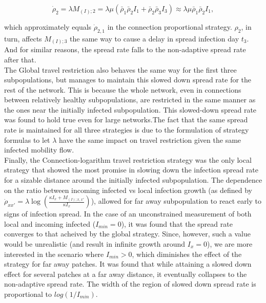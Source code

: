 \begin{equation}
	\dot{\rho}_2=\lambda M_{(I);2}= \lambda \mu (\bar{\rho}_{1} \bar{\rho}_{2} I_1 + \bar{\rho}_{2} \bar{\rho}_{3} I_3) \approx \lambda \mu \bar{\rho}_{1} \bar{\rho}_{2} I_1,
\end{equation}

which approximately equals $\dot{\rho}_{2,1}$ in the connection proportional strategy. $\rho_2$, in turn, affects $M_{(I);3}$ the same way to cause a delay in spread infection day $t_3$. And for similar reasons, the spread rate falls to the non-adaptive spread rate after that.\\

The Global travel restriction also behaves the same way for the first three subpopulations, but manages to maintain this slowed down spread rate for the rest of the network. This is because the whole network, even in connections between relatively healthy subpopulations, are restricted in the same manner as the ones near the initially infected subpopulation. This slowed-down spread rate was found to hold true even for large networks.The fact that the same spread rate is maintained for all three strategies is due to the formulation of strategy formulas to let $\lambda$ have the same impact on travel restriction given the same infected mobility flow.\\

Finally, the Connection-logarithm travel restriction strategy was the only local strategy that showed the most promise in slowing down the infection spread rate for a sizable distance around the initially infected subpopulation. The dependence on the ratio between incoming infected vs local infection growth (as defined by $\dot{\rho}_{xx'} = \lambda \log\left(\frac{\kappa I_{x} + M_{(I);x,x'}}{\kappa I_{x}}\right)$), allowed for far away subpopulation to react early to signs of infection spread. In the case of an unconstrained measurement of both local and incoming infected ($I_{min}=0$), it was found that the spread rate converges to that acheived by the global strategy. Since, however, such a value would be unrealistic (and result in infinite growth around $I_x=0$), we are more interested in the scenario where $I_{min}>0$, which diminishes the effect of the strategy for far away patches. It was found that while attaining a slowed down effect for several patches at a far away distance, it eventually collapses to the non-adaptive spread rate. The width of the region of slowed down spread rate is proportional to $log(1/I_{min})$.\\


